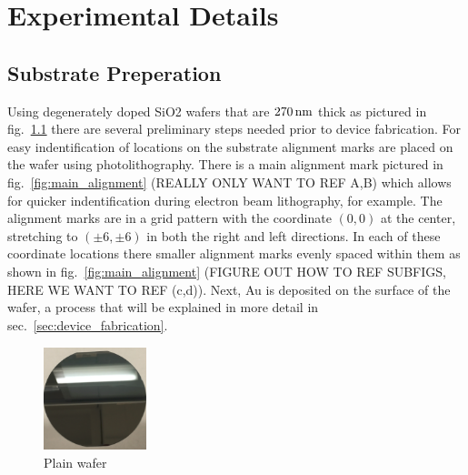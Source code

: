 \chapter{Experimental Details}\label{chap:exp_details}

\section{Substrate Preperation}\label{sec:sample_prep}
Using degenerately doped \ac{SiO2} wafers that are $270\,\mathrm{nm}$ thick as pictured in fig.~\ref{fig:plain_wafer} there are several preliminary steps needed prior to device fabrication. For easy indentification of locations on the substrate alignment marks are placed on the wafer using photolithography. There is a main alignment mark pictured in fig.~\ref{fig:main_alignment} (REALLY ONLY WANT TO REF A,B) which allows for quicker indentification during electron beam lithography, for example. The alignment marks are in a grid pattern with the coordinate $\left(0,0\right)$ at the center, stretching to $\left(\pm 6,\pm 6\right)$ in both the right and left directions. In each of these coordinate locations there smaller alignment marks evenly spaced within them as shown in fig.~\ref{fig:main_alignment} (FIGURE OUT HOW TO REF SUBFIGS, HERE WE WANT TO REF (c,d)). Next, \ac{Au} is deposited on the surface of the wafer, a process that will be explained in more detail in sec.~\ref{sec:device_fabrication}.
\begin{figure}[ht]
	\centering
	\includegraphics[height=3cm,width=3cm]{figs/experimental/plain_wafer}
	\caption[Plain wafer]{Plain wafer}
	\label{fig:plain_wafer}
\end{figure}
